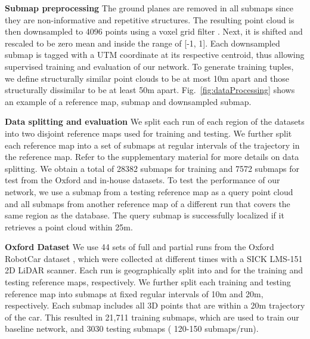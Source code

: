 \documentclass[10pt,twocolumn,letterpaper]{article}
\begin{document}
\noindent\textbf{Submap preprocessing} The ground planes are removed in all submaps since they are non-informative and repetitive structures. The resulting point cloud is then downsampled to 4096 points using a voxel grid filter \cite{Rusu_ICRA2011_PCL}. Next, it is shifted and rescaled to be zero mean and inside the range of [-1, 1]. Each downsampled submap is tagged with a UTM coordinate at its respective centroid, thus allowing supervised training and evaluation of our network. To generate training tuples, we define structurally similar point clouds to be at most 10m apart and those structurally dissimilar to be at least 50m apart. Fig.~\ref{fig:dataProcessing} shows an example of a reference map, submap and downsampled submap.
\newline
\vspace{-0.3cm}

\noindent\textbf{Data splitting and evaluation} 
We split each run of each region of the datasets into two disjoint reference maps used for training and testing. We further split each reference map into a set of submaps at regular intervals of the trajectory in the reference map. Refer to the supplementary material for more details on data splitting. We obtain a total of 28382 submaps for training and 7572 submaps for test from the Oxford and in-house datasets. To test the performance of our network, we use a submap from a testing reference map as a query point cloud and all submaps from another reference map of a different run that covers the same region as the database. The query submap is successfully localized if it retrieves a point cloud within 25m.
\newline
\vspace{-0.3cm}

\noindent\textbf{Oxford Dataset} We use 44 sets of full and partial runs from the Oxford RobotCar dataset \cite{RobotCarDatasetIJRR}, which were collected at different times with a SICK LMS-151 2D LiDAR scanner. Each run is geographically split into  and  for the training and testing reference maps, respectively. We further split each training and testing reference map into submaps at fixed regular intervals of 10m and 20m, respectively. Each submap includes all 3D points that are within a 20m trajectory of the car. This resulted in 21,711 training submaps, which are used to train our baseline network, and 3030 testing submaps ( 120-150 submaps/run). 
\newline
\vspace{-0.3cm}
\end{document}
